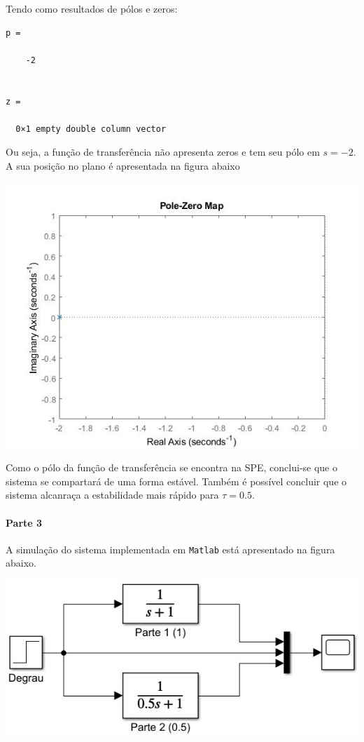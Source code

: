 \documentclass[
]{book}
\begin{document}
Tendo como resultados de pólos e zeros:

\begin{verbatim}
p =

    -2


z =

  0×1 empty double column vector
\end{verbatim}

Ou seja, a função de transferência não apresenta zeros e tem seu pólo em \(s = -2\). A sua posição no plano é apresentada na figura abaixo

\includegraphics{Imagens/Lab2/tau2.jpg}

Como o pólo da função de transferência se encontra na SPE, conclui-se que o sistema se compartará de uma forma estável. Também é possível concluir que o sistema alcanraça a estabilidade mais rápido para \(\tau = 0.5\).

\hypertarget{parte-3}{%
\paragraph*{Parte 3}\label{parte-3}}

A simulação do sistema implementada em \texttt{Matlab} está apresentado na figura abaixo.

\includegraphics{Imagens/Lab2/sim1.jpg}
\end{document}

